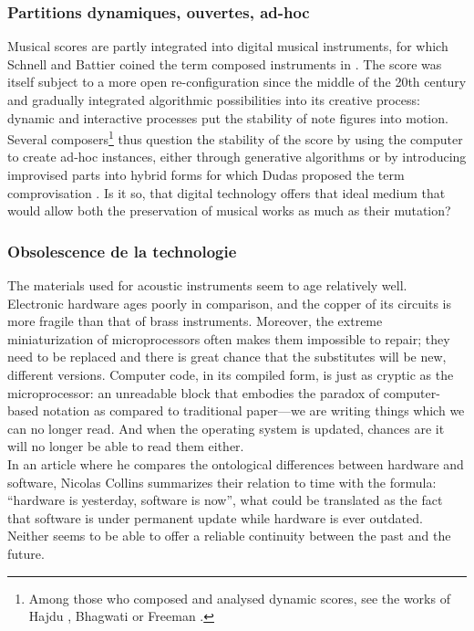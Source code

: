 \subsubsection{Partitions dynamiques, ouvertes, ad-hoc}
\noindent  Musical scores are partly integrated into digital musical instruments, for which Schnell and Battier coined the term composed instruments in \cite{schnell_introducing_2002}. The score was itself subject to a more open re-configuration since the middle of the 20th century and gradually integrated algorithmic possibilities into its creative process: dynamic and interactive processes put the stability of note figures into motion. Several composers\footnote{ Among those who composed and analysed dynamic scores, see the works of Hajdu \cite{hajdu_disposable_2016}, Bhagwati \cite{bhagwati_vexations_2017} or Freeman \cite{freeman_extreme_2008}.} thus question the stability of the score by using the computer to create ad-hoc instances, either through generative algorithms or by introducing improvised parts into hybrid forms for which Dudas proposed the term comprovisation \cite{dudas_comprovisation:_2010}. Is it so, that digital technology offers that ideal medium that would allow both the preservation of musical works as much as their mutation?

\subsubsection{Obsolescence de la technologie}
The materials used for acoustic instruments seem to age relatively well. Electronic hardware ages poorly in comparison, and the copper of its circuits is more fragile than that of brass instruments. Moreover, the extreme miniaturization of microprocessors often makes them impossible to repair; they need to be replaced and there is great chance that the substitutes will be new, different versions. Computer code, in its compiled form, is just as cryptic as the microprocessor: an unreadable block that embodies the paradox of computer-based notation as compared to traditional paper—we are writing things which we can no longer read. And when the operating system is updated, chances are it will no longer be able to read them either.\\
In an article where he compares the ontological differences between hardware and software, Nicolas Collins \cite{collins_semiconducting_2013} summarizes their relation to time with the formula: “hardware is yesterday, software is now”, what could be translated as the fact that software is under permanent update while hardware is ever outdated. Neither seems to be able to offer a reliable continuity between the past and the future.
	
